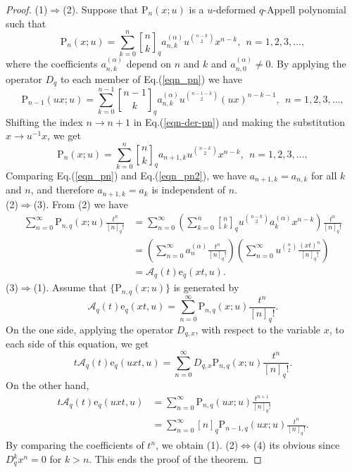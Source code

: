 \documentclass[12pt]{article}
\newcommand{\qbinom}{\genfrac{[}{]}{0pt}{}}
\newcommand{\e}{\mathrm{e}}
\newcommand{\A}{\mathcal{A}}
\newcommand{\p}{\mathrm{P}}
\begin{document}
\begin{proof}
(1)$\Rightarrow$(2). Suppose that $\p_{n}(x;u)$ is a $u$-deformed $q$-Appell polynomial such that
\begin{equation}\label{eqn_pn}
    \p_{n}(x;u)=\sum_{k=0}^{n}\qbinom{n}{k}_{q}a^{(\alpha)}_{n,k}u^{\binom{n-k}{2}}x^{n-k},\ \ n=1,2,3,\ldots,
\end{equation}
where the coefficients $a^{(\alpha)}_{n,k}$ depend on $n$ and $k$ and $a_{n,0}^{(\alpha)}\neq0$. By applying the operator $D_{q}$ to each member of Eq.(\ref{eqn_pn}) we have
\begin{equation}\label{eqn-der-pn}
    \p_{n-1}(ux;u)=\sum_{k=0}^{n-1}\qbinom{n-1}{k}_{q}a^{(\alpha)}_{n,k}u^{\binom{n-1-k}{2}}(ux)^{n-k-1},\ \ n=1,2,3,\ldots,
\end{equation}
Shifting the index $n\rightarrow n+1$ in Eq.(\ref{eqn-der-pn}) and making the substitution $x\rightarrow u^{-1}x$, we get
\begin{equation}\label{eqn_pn2}
    \p_{n}(x;u)=\sum_{k=0}^{n}\qbinom{n}{k}_{q}a_{n+1,k}u^{\binom{n-k}{2}}x^{n-k},\ \ n=1,2,3,\ldots,
\end{equation}
Comparing Eq.(\ref{eqn_pn}) and Eq.(\ref{eqn_pn2}), we have $a_{n+1,k}=a_{n,k}$ for all $k$ and $n$, and therefore $a_{n+1,k}=a_{k}$ is independent of $n$. \\
(2)$\Rightarrow$(3). From (2) we have
\begin{align*}
    \sum_{n=0}^{\infty}\p_{n,q}(x;u)\frac{t^n}{[n]_{q}!}&=\sum_{n=0}^{\infty}\left(\sum_{k=0}^{n}\qbinom{n}{k}_{q}u^{\binom{n-k}{2}}a_{k}^{(\alpha)}x^{n-k}\right)\frac{t^n}{[n]_{q}!}\\
    &=\left(\sum_{n=0}^{\infty}a_{n}^{(\alpha)}\frac{t^n}{[n]_{q}!}\right)\left(\sum_{n=0}^{\infty}u^{\binom{n}{2}}\frac{(xt)^n}{[n]_{q}!}\right)\\
    &=\A_{q}(t)\e_{q}(xt,u).
\end{align*}
(3)$\Rightarrow$(1). Assume that $\{\p_{n,q}(x;u)\}$ is generated by
\begin{equation*}
    \A_{q}(t)\e_{q}(xt,u)=\sum_{n=0}^{\infty}\p_{n,q}(x;u)\frac{t^n}{[n]_{q}!}.
\end{equation*}
On the one side, applying the operator $D_{q,x}$, with respect to the variable $x$, to each side of this equation, we get
\begin{equation*}
    t\A_{q}(t)\e_{q}(uxt,u)=\sum_{n=0}^{\infty}D_{q,x}\p_{n,q}(x;u)\frac{t^{n}}{[n]_{q}!}.
\end{equation*}
On the other hand, 
\begin{align*}
    t\A_{q}(t)\e_{q}(uxt,u)&=\sum_{n=0}^{\infty}\p_{n,q}(ux;u)\frac{t^{n+1}}{[n]_{q}!}\\
    &=\sum_{n=0}^{\infty}[n]_{q}\p_{n-1,q}(ux;u)\frac{t^{n}}{[n]_{q}!}.
\end{align*}
By comparing the coefficients of $t^n$, we obtain (1). (2)$\Longleftrightarrow$(4) its obvious since $D_{q}^{k}x^{n}=0$ for $k>n$. This ends the proof of the theorem.
\end{proof}
\end{document}
